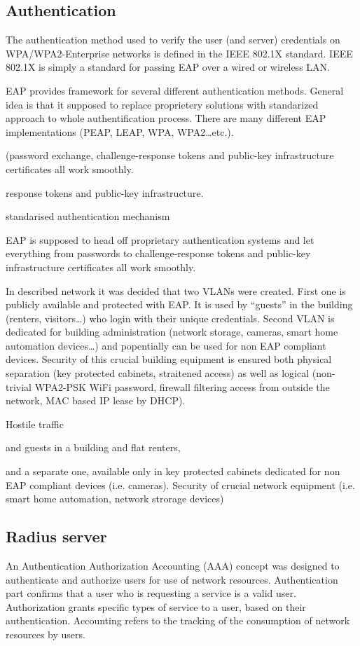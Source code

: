 \documentclass{llncs}
\begin{document}
\subsection{Authentication}

The authentication method used to verify the user (and server) credentials on
WPA/WPA2-Enterprise networks is defined in the IEEE 802.1X standard. IEEE 802.1X is simply a standard for passing EAP over a wired or wireless LAN. 

EAP provides framework for several different authentication methods. General
idea is that it supposed to replace proprietery solutions with standarized
approach to whole authentification process. There are many different EAP
implementations (PEAP, LEAP, WPA, WPA2\ldots etc.).


 (password exchange,
challenge-response tokens and public-key infrastructure certificates all work smoothly.

 response tokens and public-key infrastructure.


standarised authentication mechanism

 EAP is supposed to head off
proprietary authentication systems and let everything from passwords to challenge-response tokens and public-key
infrastructure certificates all work smoothly.

In described network it was decided that two VLANs were created. First one is
publicly available and protected with EAP. It is used by ``guests'' in the building
(renters, visitors\ldots) who login with their unique credentials. Second VLAN
is dedicated for building administration (network storage, cameras, smart home
automation devices\ldots) and popentially can be used for non EAP compliant
devices. Security of this crucial building equipment is ensured both physical
separation (key protected cabinets, straitened access) as well as logical
(non-trivial WPA2-PSK WiFi password, firewall filtering access from outside the
network, MAC based IP lease by DHCP). 

Hostile traffic

and guests in a building and
flat renters,

 and a separate one, available only in
key protected cabinets dedicated for non EAP compliant devices (i.e. cameras).
Security of crucial network equipment (i.e. smart home automation, network
strorage devices)
 


\subsection{Radius server}
An Authentication Authorization Accounting (AAA) \cite{rfc2903}\cite{rfc2904}
concept was designed to authenticate and authorize users for use of network
resources. Authentication part confirms that a user who is requesting a service
is a valid user. Authorization grants specific types of service to a user, based
on their authentication. Accounting refers to the tracking of the consumption of
network resources by users.
\end{document}
